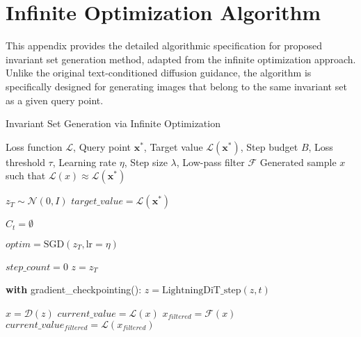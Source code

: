\appendix

\section{Infinite Optimization Algorithm}\label{appendix:infinite_optimization}
This appendix provides the detailed algorithmic specification for proposed invariant set generation method, adapted from the infinite optimization approach. Unlike the original text-conditioned diffusion guidance, the algorithm is specifically designed for generating images that belong to the same invariant set as a given query point.

\begin{algorithm}[H]
\caption{Invariant Set Generation via Infinite Optimization}
\label{alg:invariant_generation}
\begin{algorithmic}[1]
\Require Loss function $\mathcal{L}$, Query point $\mathbf{x^*}$, Target value $\mathcal{L}(\mathbf{x^*})$, Step budget $B$, Loss threshold $\tau$, Learning rate $\eta$, Step size $\lambda$, Low-pass filter $\mathcal{F}$
\Ensure Generated sample $x$ such that $\mathcal{L}(x) \approx \mathcal{L}(\mathbf{x^*})$

\State $z_T \sim \mathcal{N}(0, I)$ 
\State $target\_value = \mathcal{L}(\mathbf{x^*})$ 

 
    \State $C_t = \emptyset$ 
\EndFor

\State $optim = \text{SGD}(z_T, \text{lr}=\eta)$ 

\State $step\_count = 0$ 
 
    \State $z = z_T$ 
    
     
        \State \textbf{with} gradient\_checkpointing():
        \State \quad $z = \text{LightningDiT\_step}(z, t)$ 
    \EndFor
    
    \State $x = \mathcal{D}(z)$ 
    \State $current\_value = \mathcal{L}(x)$ 
    \State $x_{filtered} = \mathcal{F}(x)$ 
    \State $current\_value_{filtered} = \mathcal{L}(x_{filtered})$ 
    

\end{algorithmic}
\end{algorithm}
